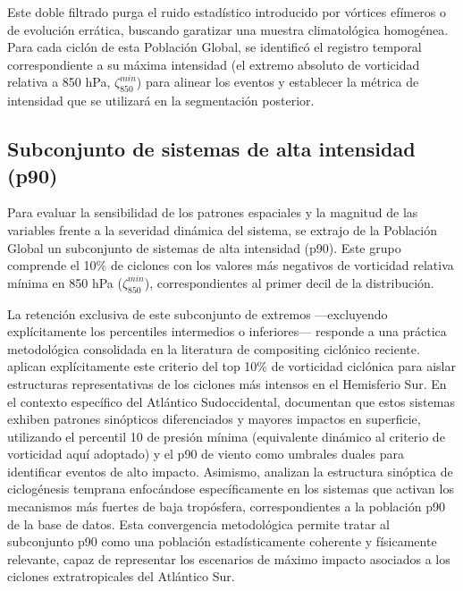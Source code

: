 Este doble filtrado purga el ruido estadístico introducido por vórtices efímeros o de evolución errática, buscando garatizar una muestra climatológica homogénea. Para cada ciclón de esta Población Global, se identificó el registro temporal correspondiente a su máxima intensidad (el extremo absoluto de vorticidad relativa a 850 hPa, $\zeta_{850}^{min}$) para alinear los eventos y establecer la métrica de intensidad que se utilizará en la segmentación posterior. 

\subsection{Subconjunto de sistemas de alta intensidad (p90)}\label{subsec:subconjuntos_intensidad}

Para evaluar la sensibilidad de los patrones espaciales y la magnitud de las variables frente a la severidad dinámica del sistema, se extrajo de la Población Global un subconjunto de sistemas de alta intensidad (p90). Este grupo comprende el 10\% de ciclones con los valores más negativos de vorticidad relativa mínima en 850 hPa ($\zeta_{850}^{min}$), correspondientes al primer decil de la distribución.

La retención exclusiva de este subconjunto de extremos —excluyendo explícitamente los percentiles intermedios o inferiores— responde a una práctica metodológica consolidada en la literatura de compositing ciclónico reciente. \citet{priestley2022improved} aplican explícitamente este criterio del top 10\% de vorticidad ciclónica para aislar estructuras representativas de los ciclones más intensos en el Hemisferio Sur. En el contexto específico del Atlántico Sudoccidental, \citet{andrade2024composite} documentan que estos sistemas exhiben patrones sinópticos diferenciados y mayores impactos en superficie, utilizando el percentil 10 de presión mínima (equivalente dinámico al criterio de vorticidad aquí adoptado) y el p90 de viento como umbrales duales para identificar eventos de alto impacto. Asimismo, \citet{gramcianinov2024early} analizan la estructura sinóptica de ciclogénesis temprana enfocándose específicamente en los sistemas que activan los mecanismos más fuertes de baja tropósfera, correspondientes a la población p90 de la base de datos. Esta convergencia metodológica permite tratar al subconjunto p90 como una población estadísticamente coherente y físicamente relevante, capaz de representar los escenarios de máximo impacto asociados a los ciclones extratropicales del Atlántico Sur.

